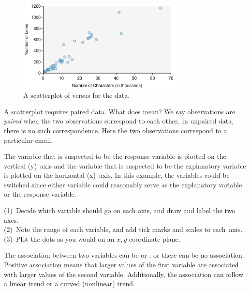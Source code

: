 \setlength{\captionwidth}{0.885\textwidth}

\begin{figure}[h]
   \centering
   \includegraphics[width=0.75\textwidth]{ch_summarizing_data/figures/email50LinesCharacters/email50LinesCharacters}
   \caption{A scatterplot of  versus  for the  data.}
   \label{email50LinesCharacters}
\end{figure}

\setlength{\captionwidth}{\mycaptionwidth}

\begin{example}{A scatterplot requires paired data. What does  mean?}
We say observations are \emph{paired} when the two observations correspond to each other. In unpaired data, there is no such correspondence. Here the two observations correspond to a particular email.
\end{example}

The variable that is suspected to be the response variable is plotted on the vertical (y)~axis and the variable that is suspected to be the explanatory variable is plotted on the horizontal (x)~axis. In this example, the variables could be switched since either variable could reasonably serve as the explanatory variable or the response variable.

\begin{tipBox}{
(1)~Decide which variable should go on each axis, and draw and label the two axes. \\
(2)~Note the range of each variable, and add tick marks and scales to each~axis. \\
(3)~Plot the dots as you would on an $x,y$-coordinate plane.}
\end{tipBox}

The association between two variables can be  or , or there can be no association. Positive association means that larger values of the first variable are associated with larger values of the second variable. Additionally, the association can follow a linear trend or a curved (nonlinear) trend.

